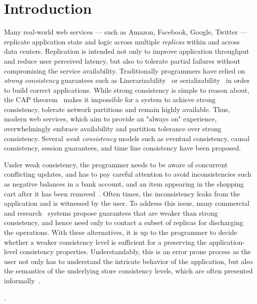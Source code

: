 \section{Introduction}

Many real-world web services --- such as Amazon, Facebook, Google, Twitter ---
replicate application state and logic across multiple \emph{replicas} within
and across data centers. Replication is intended not only to improve
application throughput and reduce user perceived latency, but also to tolerate
partial failures without compromising the service availability. Traditionally
programmers have relied on \emph{strong consistency} guarantees such as
Linerarizability~\cite{Herlihy1990} or serializability~\cite{Serializability}
in order to build correct applications. While strong consistency is simple to
reason about, the CAP theorem~\cite{Brewer2000,Gilbert} makes it impossible for
a system to achieve strong consistency, tolerate network partitions and remain
highly available. Thus, modern web services, which aim to provide an "always
on" experience, overwhelmingly embrace availability and partition tolerance
over strong consistency. Several \emph{weak consistency} models such as
eventual consistency, causal consistency, session guarantees, and time line
consistency have been proposed.

Under weak consistency, the programmer needs to be aware of concurrent
conflicting updates, and has to pay careful attention to avoid inconsistencies
such as negative balances in a bank account, and an item appearing in the
shopping cart after it has been removed~\cite{Dynamo}. Often times, the
inconsistency leaks from the application and is witnessed by the user. To
address this issue, many commercial~\cite{} and research~\cite{} systems
propose guarantees that are weaker than strong consistency, and hence need only
to contact a subset of replicas for discharging the operations. With these
alternatives, it is up to the programmer to decide whether a weaker consistency
level is sufficient for a preserving the application-level consistency
properties. Understandably, this is an error prone process as the user not only
has to understand the intricate behavior of the application, but also the
semantics of the underlying store consistency levels, which are often presented
informally~\cite{}.

.

